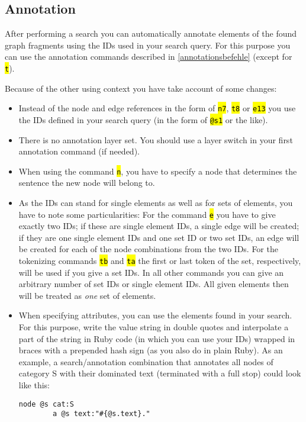 \documentclass[12pt]{scrartcl}
\newcommand{\code}[1]{\hl{\texttt{#1}}}
\begin{document}
\subsection{Annotation}

After performing a search you can automatically annotate elements of the found graph fragments using the IDs used in your search query.
For this purpose you can use the annotation commands described in \ref{annotationsbefehle} (except for \code{t}).

Because of the other using context you have take account of some changes:
\begin{itemize}
	\item Instead of the node and edge references in the form of \code{n7}, \code{t8} or \code{e13} you use the IDs defined in your search query (in the form of \code{@s1} or the like).
	\item There is no annotation layer set. You should use a layer switch in your first annotation command (if needed).
	\item When using the command \code{n}, you have to specify a node that determines the sentence the new node will belong to.
	\item As the IDs can stand for single elements as well as for sets of elements, you have to note some particularities: For the command \code{e} you have to give exactly two IDs; if these are single element IDs, a single edge will be created; if they are one single element IDs and one set ID or two set IDs, an edge will be created for each of the node combinations from the two IDs. For the tokenizing commands \code{tb} and \code{ta} the first or last token of the set, respectively, will be used if you give a set IDs. In all other commands you can give an arbitrary number of set IDs or single element IDs. All given elements then will be treated as \textit{one} set of elements.
	\item When specifying attributes, you can use the elements found in your search. For this purpose, write the value string in double quotes and interpolate a part of the string in Ruby code (in which you can use your IDs) wrapped in braces with a prepended hash sign (as you also do in plain Ruby). As an example, a search/annotation combination that annotates all nodes of category S with their dominated text (terminated with a full stop) could look like this:
	\begin{lstlisting}[gobble=8]
		node @s cat:S
		a @s text:"#{@s.text}."
	\end{lstlisting}
\end{itemize}
\end{document}
